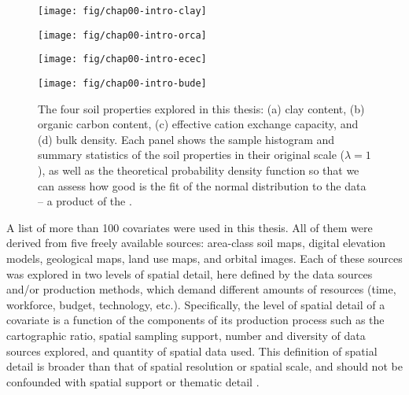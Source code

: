 \begin{figure}[!ht]
\centering
\begin{minipage}[b]{63mm}
\subcaption{}
\centering
\texttt{[image: fig/chap00-intro-clay]}
\end{minipage}
\begin{minipage}[b]{63mm}
\subcaption{}
\centering
\texttt{[image: fig/chap00-intro-orca]}
\end{minipage}
\begin{minipage}[b]{63mm}
\subcaption{}
\centering
\texttt{[image: fig/chap00-intro-ecec]}
\end{minipage}
\begin{minipage}[b]{63mm}
\subcaption{}
\centering
\texttt{[image: fig/chap00-intro-bude]}
\end{minipage}
\caption{The four soil properties explored in this thesis: (a) clay content, (b) organic carbon 
content, (c) effective cation exchange capacity, and (d) bulk density. Each panel shows the sample 
histogram and summary statistics of the soil properties in their original scale ($\lambda = 1$), as 
well as the theoretical probability density function so that we can assess how good is the fit of 
the normal distribution to the data -- a product of the .}
\label{fig:intro-soil-properties}
\end{figure}

A list of more than \num{100} covariates were used in this thesis. All of them were derived from 
five freely available sources: area-class soil maps, digital elevation models, geological maps,
land use maps, and orbital images. Each of these sources was explored in two levels of spatial 
detail, here defined by the data sources and/or production methods, which demand different amounts 
of resources (time, workforce, budget, technology, etc.). Specifically, the level of spatial detail 
of a covariate is a function of the components of its production process such as the cartographic 
ratio, spatial sampling support, number and diversity of data sources explored, and quantity of 
spatial data used. This definition of spatial detail is broader than that of spatial resolution
or spatial scale, and should not be confounded with spatial support \citep{WebsterEtAl2007} or 
thematic detail \citep{Rossiter2000}.

